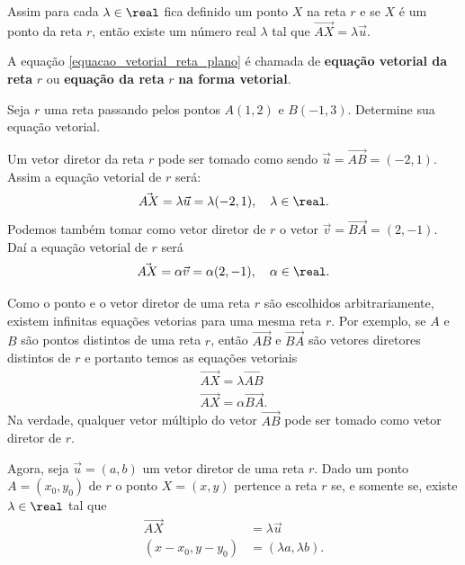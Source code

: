 Assim para cada $\lambda \in \real$ fica definido um ponto $X$ na reta $r$ e se $X$ é um ponto da reta $r$, então existe um número real $\lambda$ tal que $\vec{AX} = \lambda\vec{u}$.

\begin{definicao}
  A equação \eqref{equacao_vetorial_reta_plano} é chamada de \textbf{equação vetorial da reta} $r$ ou \textbf{equação da reta} $r$ \textbf{na forma vetorial}.
\end{definicao}

\begin{exemplos}
  Seja $r$ uma reta passando pelos pontos $A(1,2)$ e $B(-1, 3)$. Determine sua equação vetorial.
  \begin{solucao}
    Um vetor diretor da reta $r$ pode ser tomado como sendo $\vec{u} = \vec{AB} = (-2, 1)$. Assim a equação vetorial de $r$ será:
    \[
      \vec{AX} = \lambda\vec{u} = \lambda(-2,1), \quad \lambda \in \real.
    \]
    Podemos também tomar como vetor diretor de $r$ o vetor $\vec{v} = \vec{BA} = (2,-1)$. Daí a equação vetorial de $r$ será
    \[
      \vec{AX} = \alpha\vec{v} = \alpha(2, -1), \quad \alpha \in \real.
    \]
  \end{solucao}
\end{exemplos}

\begin{observacao}
  Como o ponto e o vetor diretor de uma reta $r$ são escolhidos arbitrariamente, existem infinitas equações vetorias para uma mesma reta $r$. Por exemplo, se $A$ e $B$ são pontos distintos de uma reta $r$, então $\vec{AB}$ e $\vec{BA}$ são vetores diretores distintos de $r$ e portanto temos as equações vetoriais
  \begin{align*}
    \vec{AX} = \lambda\vec{AB}\\
    \vec{AX} = \alpha\vec{BA}.
  \end{align*}
  Na verdade, qualquer vetor múltiplo do vetor $\vec{AB}$ pode ser tomado como vetor diretor de $r$.
\end{observacao}

Agora, seja $\vec{u} = (a, b)$ um vetor diretor de uma reta $r$. Dado um ponto $A = (x_0, y_0)$ de $r$ o ponto $X = (x, y)$ pertence a reta $r$ se, e somente se, existe $\lambda \in \real$ tal que
\begin{align*}
  \vec{AX} &= \lambda\vec{u}\\
  (x - x_0, y - y_0) &= (\lambda a, \lambda b).
\end{align*}

